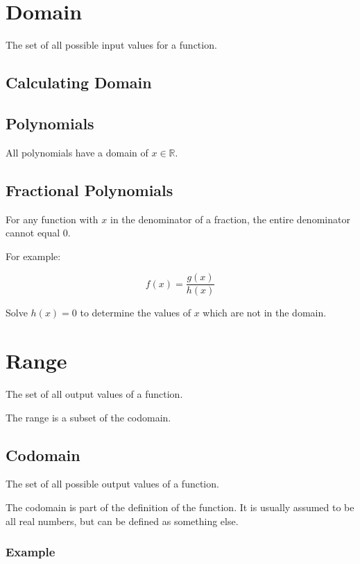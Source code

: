 \documentclass[a4paper,11pt]{article}
\begin{document}
\section{Domain}

The set of all possible input values for a function.


\subsection{Calculating Domain}

\subsection{Polynomials}

All polynomials have a domain of $x \in \mathbb{R}$.


\subsection{Fractional Polynomials}

For any function with $x$ in the denominator of a fraction, the entire
denominator cannot equal 0.

For example:

$$
f(x) = \frac{g(x)}{h(x)}
$$

Solve $h(x) = 0$ to determine the values of $x$ which are not in the domain.



\section{Range}

The set of all output values of a function.

The range is a subset of the codomain.


\subsection{Codomain}

The set of all possible output values of a function.

The codomain is part of the definition of the function. It is usually assumed
to be all real numbers, but can be defined as something else.


\subsubsection{Example}
\end{document}
